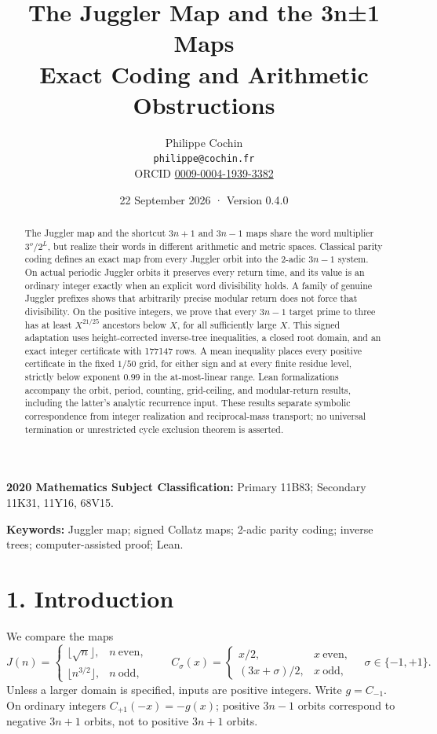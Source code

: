 \documentclass[11pt,a4paper]{article}
\title{The Juggler Map and the 3n±1 Maps\\[0.5em]{\large Exact Coding
and Arithmetic Obstructions}}
\author{Philippe Cochin \\ \texttt{philippe@cochin.fr} \\
  \small ORCID \href{https://orcid.org/0009-0004-1939-3382}{0009-0004-1939-3382}}
\date{22 September 2026 · Version 0.4.0}
\begin{document}
\maketitle
\begin{abstract}

The Juggler map and the shortcut \(3n+1\) and \(3n-1\) maps share the
word multiplier \(3^o/2^L\), but realize their words in different
arithmetic and metric spaces. Classical parity coding defines an exact
map from every Juggler orbit into the 2-adic \(3n-1\) system. On actual
periodic Juggler orbits it preserves every return time, and its value is
an ordinary integer exactly when an explicit word divisibility holds. A
family of genuine Juggler prefixes shows that arbitrarily precise
modular return does not force that divisibility. On the positive
integers, we prove that every \(3n-1\) target prime to three has at
least \(X^{21/25}\) ancestors below \(X\), for all sufficiently large
\(X\). This signed adaptation uses height-corrected inverse-tree
inequalities, a closed root domain, and an exact integer certificate
with 177147 rows. A mean inequality places every positive certificate in
the fixed \(1/50\) grid, for either sign and at every finite residue
level, strictly below exponent \(0.99\) in the at-most-linear range.
Lean formalizations accompany the orbit, period, counting, grid-ceiling,
and modular-return results, including the latter's analytic recurrence
input. These results separate symbolic correspondence from integer
realization and reciprocal-mass transport; no universal termination or
unrestricted cycle exclusion theorem is asserted.

\end{abstract}

\textbf{2020 Mathematics Subject Classification:} Primary 11B83;
Secondary 11K31, 11Y16, 68V15.

\textbf{Keywords:} Juggler map; signed Collatz maps; 2-adic parity
coding; inverse trees; computer-assisted proof; Lean.

\section{1. Introduction}\label{introduction}

We compare the maps \[
J(n)=
\begin{cases}
\lfloor\sqrt n\rfloor,&n\ \text{even},\\
\lfloor n^{3/2}\rfloor,&n\ \text{odd},
\end{cases}
\qquad
C_\sigma(x)=
\begin{cases}
x/2,&x\ \text{even},\\
(3x+\sigma)/2,&x\ \text{odd},
\end{cases}
\quad \sigma\in\{-1,+1\}.
\] Unless a larger domain is specified, inputs are positive integers.
Write \(g=C_{-1}\). On ordinary integers \(C_{+1}(-x)=-g(x)\); positive
\(3n-1\) orbits correspond to negative \(3n+1\) orbits, not to positive
\(3n+1\) orbits.
\end{document}
